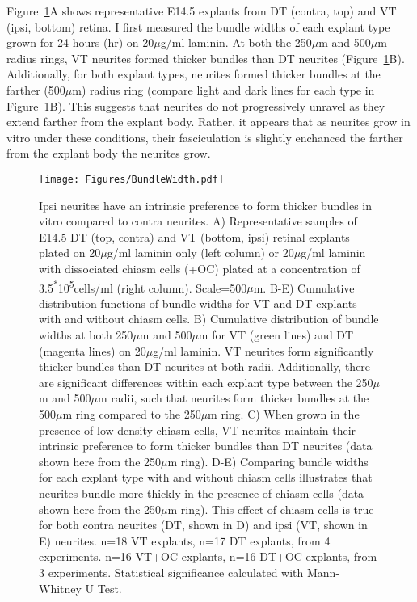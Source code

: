 Figure~\ref{Figures/BundleWidth}A shows representative E14.5 explants from DT (contra, top) and VT (ipsi, bottom) retina.
I first measured the bundle widths of each explant type grown for 24 hours (hr) on 20$\mu$g/ml laminin.
At both the 250$\mu$m and 500$\mu$m radius rings, VT neurites formed thicker bundles than DT neurites (Figure~\ref{Figures/BundleWidth}B).
Additionally, for both explant types, neurites formed thicker bundles at the farther (500$\mu$m) radius ring (compare light and dark lines for each type in Figure~\ref{Figures/BundleWidth}B).
This suggests that neurites do not progressively unravel as they extend farther from the explant body.
Rather, it appears that as neurites grow in vitro under these conditions, their fasciculation is slightly enchanced the farther from the explant body the neurites grow.
\begin{figure}[hbtp]
    \begin{center}
        \texttt{[image: Figures/BundleWidth.pdf]}
        \caption[Ipsi neurites have an intrinsic preference to form thicker bundles in vitro compared to contra neurites.]
        {Ipsi neurites have an intrinsic preference to form thicker bundles in vitro compared to contra neurites.
        A) Representative samples of E14.5 DT (top, contra) and VT (bottom, ipsi) retinal explants plated on 20$\mu$g/ml laminin only (left column) or 20$\mu$g/ml laminin with dissociated chiasm cells (+OC) plated at a concentration of 3.5\textsuperscript{*}10\textsuperscript{5}cells/ml (right column).
        Scale=500$\mu$m.
        B-E) Cumulative distribution functions of bundle widths for VT and DT explants with and without chiasm cells.
        B) Cumulative distribution of bundle widths at both 250$\mu$m and 500$\mu$m for VT (green lines) and DT (magenta lines) on 20$\mu$g/ml laminin.
        VT neurites form significantly thicker bundles than DT neurites at both radii.
        Additionally, there are significant differences within each explant type between the 250$\mu$m and 500$\mu$m radii, such that neurites form thicker bundles at the 500$\mu$m ring compared to the 250$\mu$m ring.
        C) When grown in the presence of low density chiasm cells, VT neurites maintain their intrinsic preference to form thicker bundles than DT neurites (data shown here from the 250$\mu$m ring).
        D-E) Comparing bundle widths for each explant type with and without chiasm cells illustrates that neurites bundle more thickly in the presence of chiasm cells (data shown here from the 250$\mu$m ring).
        This effect of chiasm cells is true for both contra neurites (DT, shown in D) and ipsi (VT, shown in E) neurites.
        n=18 VT explants, n=17 DT explants, from 4 experiments.
        n=16 VT+OC explants, n=16 DT+OC explants, from 3 experiments.
        Statistical significance calculated with Mann-Whitney U Test.
        }
        \label{Figures/BundleWidth}
    \end{center}
\end{figure}

